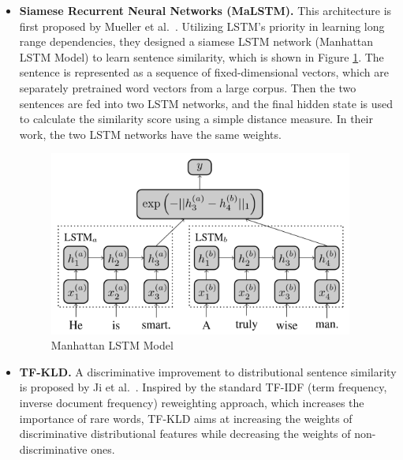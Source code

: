 \documentclass[runningheads]{llncs}
\begin{document}
\begin{itemize}
	\item \textbf{Siamese Recurrent Neural Networks (MaLSTM).} This architecture is first proposed by Mueller et al.~\cite{mueller2016siamese}. Utilizing LSTM's priority in learning long range dependencies, they designed a siamese LSTM network (Manhattan LSTM Model) to learn sentence similarity, which is shown in Figure \ref{fig:1}. The sentence is represented as a sequence of fixed-dimensional vectors, which are separately pretrained word vectors from a large corpus. Then the two sentences are fed into two LSTM networks, and the final hidden state is used to calculate the similarity score using a simple distance measure. In their work, the two LSTM networks have the same weights.
	\begin{figure}[htbp]
		\centering
		\includegraphics[width=10cm]{./1.png}
		\caption{Manhattan LSTM Model}\label{fig:1}
	\end{figure}
	\item \textbf{TF-KLD.} A discriminative improvement to distributional sentence similarity is proposed by Ji et al.~\cite{ji2013discriminative}. Inspired by the standard TF-IDF (term frequency, inverse document frequency) reweighting approach, which increases the importance of rare words, TF-KLD aims at increasing the weights of discriminative distributional features while decreasing the weights of non-discriminative ones.
	

\end{itemize}
\end{document}
